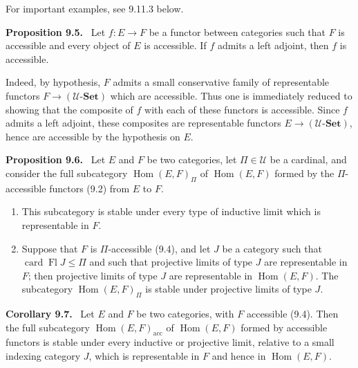 \documentclass[11pt]{article}
\newcommand{\U}{\mathcal{U}}
\newcommand{\Set}{\mathbf{Set}}
\newcommand{\card}{\operatorname{card}}
\newcommand{\Fl}{\operatorname{Fl}}
\newcommand{\Hhom}{\operatorname{Hom}}
\newcommand{\acc}{\mathrm{acc}}
\newenvironment{statement}[1]{\par\medskip\noindent\textbf{#1.}\ }{\par\medskip}
\begin{document}
For important examples, see 9.11.3 below.

\begin{statement}{Proposition 9.5}
Let $f:E\to F$ be a functor between categories such that $F$ is accessible and every object of $E$ is accessible. If $f$ admits a left adjoint, then $f$ is accessible.
\end{statement}

Indeed, by hypothesis, $F$ admits a small conservative family of representable functors $F\to(\U\text{-}\Set)$ which are accessible. Thus one is immediately reduced to showing that the composite of $f$ with each of these functors is accessible. Since $f$ admits a left adjoint, these composites are representable functors $E\to(\U\text{-}\Set)$, hence are accessible by the hypothesis on $E$.

\begin{statement}{Proposition 9.6}
Let $E$ and $F$ be two categories, let $\Pi\in\U$ be a cardinal, and consider the full subcategory $\Hhom(E,F)_\Pi$ of $\Hhom(E,F)$ formed by the $\Pi$-accessible functors (9.2) from $E$ to $F$.
\begin{enumerate}[label=(\roman*)]
\item This subcategory is stable under every type of inductive limit which is representable in $F$.

\item Suppose that $F$ is $\Pi$-accessible (9.4), and let $J$ be a category such that $\card\Fl J\leq \Pi$ and such that projective limits of type $J$ are representable in $F$; then projective limits of type $J$ are representable in $\Hhom(E,F)$. The subcategory $\Hhom(E,F)_\Pi$ is stable under projective limits of type $J$.
\end{enumerate}
\end{statement}

\begin{statement}{Corollary 9.7}
Let $E$ and $F$ be two categories, with $F$ accessible (9.4). Then the full subcategory $\Hhom(E,F)_{\acc}$ of $\Hhom(E,F)$ formed by accessible functors is stable under every inductive or projective limit, relative to a small indexing category $J$, which is representable in $F$ and hence in $\Hhom(E,F)$.
\end{statement}
\end{document}

